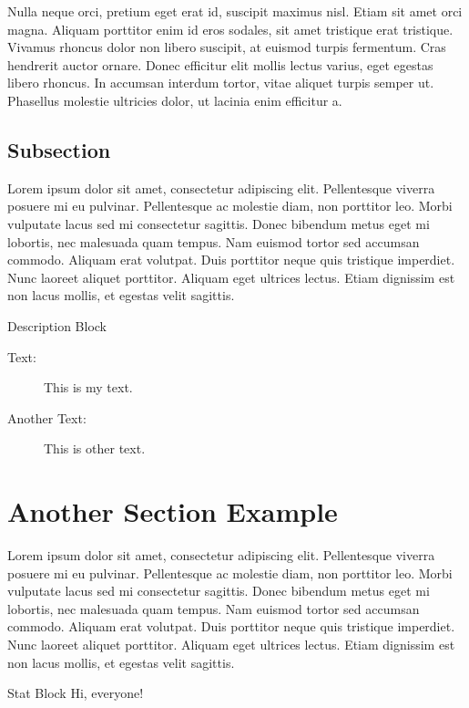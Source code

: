\documentclass{arcanum}
\begin{document}
Nulla neque orci, pretium eget erat id, suscipit maximus nisl. Etiam sit amet
orci magna. Aliquam porttitor enim id eros sodales, sit amet tristique erat
tristique. Vivamus rhoncus dolor non libero suscipit, at euismod turpis fermentum.
Cras hendrerit auctor ornare. Donec efficitur elit mollis lectus varius, eget
egestas libero rhoncus. In accumsan interdum tortor, vitae aliquet turpis semper
ut. Phasellus molestie ultricies dolor, ut lacinia enim efficitur a.

\subsection{Subsection}
Lorem ipsum dolor sit amet, consectetur adipiscing elit. Pellentesque viverra
posuere mi eu pulvinar. Pellentesque ac molestie diam, non porttitor leo. Morbi
vulputate lacus sed mi consectetur sagittis. Donec bibendum metus eget mi lobortis,
nec malesuada quam tempus. Nam euismod tortor sed accumsan commodo. Aliquam erat
volutpat. Duis porttitor neque quis tristique imperdiet. Nunc laoreet aliquet
porttitor. Aliquam eget ultrices lectus. Etiam dignissim est non lacus mollis,
et egestas velit sagittis.

\begin{descriptionblock}{Description Block}
  \begin{description}
    \item[Text:] This is my text.
    \item[Another Text:] This is other text.
  \end{description}
\end{descriptionblock}

\section{Another Section Example}
Lorem ipsum dolor sit amet, consectetur adipiscing elit. Pellentesque viverra
posuere mi eu pulvinar. Pellentesque ac molestie diam, non porttitor leo. Morbi
vulputate lacus sed mi consectetur sagittis. Donec bibendum metus eget mi lobortis,
nec malesuada quam tempus. Nam euismod tortor sed accumsan commodo. Aliquam erat
volutpat. Duis porttitor neque quis tristique imperdiet. Nunc laoreet aliquet
porttitor. Aliquam eget ultrices lectus. Etiam dignissim est non lacus mollis,
et egestas velit sagittis.

\begin{statblock}{Stat Block}
  Hi, everyone!
\end{statblock}
\end{document}
